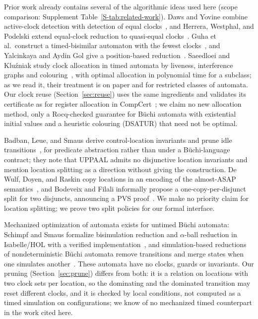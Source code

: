 Prior work already contains several of the algorithmic ideas used here (scope comparison: Supplement Table~\ref{S-tab:related-work}). Daws and Yovine combine active-clock detection with detection of equal clocks~\cite{daws_yovine_rtss1996}, and Herrera, Westphal, and Podelski extend equal-clock reduction to quasi-equal clocks~\cite{herrera_westphal_podelski_tacas2014}. Guha et al.\ construct a timed-bisimilar automaton with the fewest clocks~\cite{guha_narayan_arunkumar_concur2014}, and Yalcinkaya and Aydin Gol give a position-based reduction~\cite{yalcinkaya_aydin_gol_formalise2019}. Saeedloei and Kluźniak study clock allocation in timed automata by liveness, interference graphs and colouring~\cite{saeedloei_kluzniak_hscc2018}, with optimal allocation in polynomial time for a subclass; as we read it, their treatment is on paper and for restricted classes of automata. Our clock reuse (Section~\ref{sec:reuse}) uses the same ingredients and validates its certificate as for register allocation in CompCert~\cite{rideau_leroy_cc2010}; we claim no new allocation method, only a Rocq-checked guarantee for B\"uchi automata with existential initial values and a heuristic colouring (DSATUR) that need not be optimal.

Badban, Leue, and Smaus derive control-location invariants and prune idle transitions~\cite{badban_etal_wing2010}, for predicate abstraction rather than under a B\"uchi-language contract; they note that UPPAAL admits no disjunctive location invariants and mention location splitting as a direction without giving the construction. De Wulf, Doyen, and Raskin copy locations in an encoding of the almost-ASAP semantics~\cite{de_wulf_doyen_raskin_fm2005}, and Bodeveix and Filali informally propose a one-copy-per-disjunct split for two disjuncts, announcing a PVS proof~\cite{[BF03]}. We make no priority claim for location splitting; we prove two split policies for our formal interface.

Mechanized optimization of automata exists for untimed B\"uchi automata: Schimpf and Smaus formalize bisimulation reduction and $\alpha$-ball reduction in Isabelle/HOL with a verified implementation~\cite{schimpf_smaus_ila2015}, and simulation-based reductions of nondeterministic B\"uchi automata remove transitions and merge states when one simulates another~\cite{clemente_mayr_lmcs19}. These automata have no clocks, guards or invariants. Our pruning (Section~\ref{sec:prune}) differs from both: it is a relation on locations with two clock sets per location, so the dominating and the dominated transition may reset different clocks, and it is checked by local conditions, not computed as a timed simulation on configurations; we know of no mechanized timed counterpart in the work cited here.

